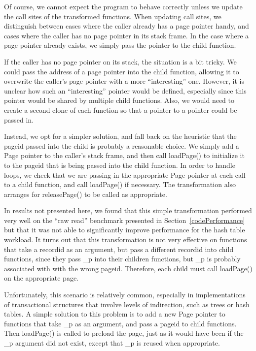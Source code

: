 \documentclass[10pt,letterpaper,twocolumn,english]{article}
\newcommand{\pin}{loadPage()\xspace}
\newcommand{\unpin}{releasePage()\xspace}
\newcommand{\PP}{\_p\xspace}
\begin{document}
Of course, we cannot expect the program to behave correctly unless we
update the call sites of the transformed functions.  When updating
call sites, we distinguish between cases where the caller already has
a page pointer handy, and cases where the caller has no page pointer
in its stack frame.  In the case where a page pointer already exists,
we simply pass the pointer to the child function.

If the caller has no page pointer on its stack, the situation is a bit
tricky.  We could pass the address of a page pointer into the child
function, allowing it to overwrite the caller's page pointer with a
more ``interesting'' one.  However, it is unclear how such an
``interesting'' pointer would be defined, especially since this
pointer would be shared by multiple child functions.  Also, we would need
to create a second clone of each function so that a pointer to a
pointer could be passed in.  

Instead, we opt for a simpler solution, and fall back on the heuristic
that the pageid passed into the child is probably a reasonable choice.
We simply add a Page pointer to the caller's stack frame, and then
call \pin to initialize it to the pageid that is being passed into the
child function.  In order to handle loops, we check that we are
passing in the appropriate Page pointer at each call to a child
function, and call \pin if necessary.  The
transformation also arranges for \unpin to be called as appropriate.

In results not presented here, we found that this simple
transformation performed very well on the ``raw read'' benchmark
presented in Section~\ref{codePerformance} but that it was not able to
significantly improve performance for the hash table workload.  It
turns out that this transformation is not very effective on functions
that take a recordid as an argument, but pass a different recordid
into child functions, since they pass \PP into their children
functions, but \PP is probably associated with with the wrong pageid.
Therefore, each child must call \pin on the appropriate page. 

Unfortunately, this scenario is relatively common, especially in
implementations of transactional structures that involve levels of
indirection, such as trees or hash tables.  A simple solution to this
problem is to add a new Page pointer to functions that take \PP as an
argument, and pass a pageid to child functions.  Then \pin is called
to preload the page, just as it would have been if the \PP argument
did not exist, except that \PP is reused when appropriate.
\end{document}
